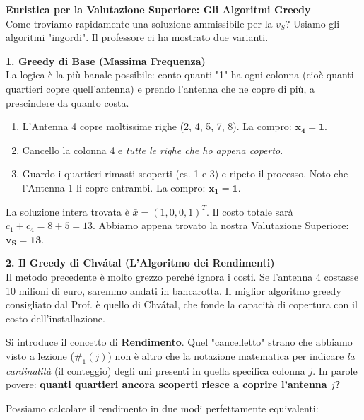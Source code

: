 \documentclass[12pt, a4paper]{article}
\newcommand{\separatore}{\noindent{\color{titlecolor!50}\rule{\textwidth}{0.6pt}}}
\begin{document}
	\vspace{0.6cm}
	\separatore
	\vspace{0.4cm}
	
	\textbf{Euristica per la Valutazione Superiore: Gli Algoritmi Greedy}\\
	Come troviamo rapidamente una soluzione ammissibile per la $v_S$? Usiamo gli algoritmi "ingordi". Il professore ci ha mostrato due varianti.
	
	\textbf{1. Greedy di Base (Massima Frequenza)}\\
	La logica è la più banale possibile: conto quanti "1" ha ogni colonna (cioè quanti quartieri copre quell'antenna) e prendo l'antenna che ne copre di più, a prescindere da quanto costa.
	\begin{enumerate}[itemsep=2pt]
		\item L'Antenna 4 copre moltissime righe (2, 4, 5, 7, 8). La compro: $\mathbf{x_4 = 1}$.
		\item Cancello la colonna 4 e \textit{tutte le righe che ho appena coperto}.
		\item Guardo i quartieri rimasti scoperti (es. 1 e 3) e ripeto il processo. Noto che l'Antenna 1 li copre entrambi. La compro: $\mathbf{x_1 = 1}$.
	\end{enumerate}
	La soluzione intera trovata è $\bar{x} = (1, 0, 0, 1)^T$. Il costo totale sarà $c_1 + c_4 = 8 + 5 = 13$.
	Abbiamo appena trovato la nostra Valutazione Superiore: $\mathbf{v_S = 13}$.
	
	\vspace{0.4cm}
	\textbf{2. Il Greedy di Chvátal (L'Algoritmo dei Rendimenti)}\\
	Il metodo precedente è molto grezzo perché ignora i costi. Se l'antenna 4 costasse 10 milioni di euro, saremmo andati in bancarotta. Il miglior algoritmo greedy consigliato dal Prof. è quello di Chvátal, che fonde la capacità di copertura con il costo dell'installazione.
	
	Si introduce il concetto di \textbf{Rendimento}. Quel "cancelletto" strano che abbiamo visto a lezione ($\#_1(j)$) non è altro che la notazione matematica per indicare \textit{la cardinalità} (il conteggio) degli uni presenti in quella specifica colonna $j$. In parole povere: \textbf{quanti quartieri ancora scoperti riesce a coprire l'antenna $j$?}
	
	Possiamo calcolare il rendimento in due modi perfettamente equivalenti:
	
\end{document}
